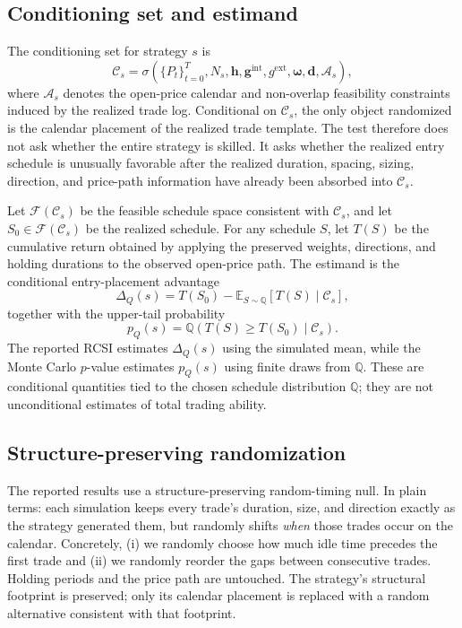 \documentclass[preprint,12pt]{elsarticle}
\theoremstyle{definition}
\begin{document}
\subsection{Conditioning set and estimand}
\label{sec:conditioning-estimand}

The conditioning set for strategy $s$ is
\[
\mathcal{C}_s =
\sigma\!\left(
\{P_t\}_{t=0}^{T},
N_s,
\mathbf{h},
\mathbf{g}^{\mathrm{int}},
g^{\mathrm{ext}},
\boldsymbol{\omega},
\mathbf{d},
\mathcal{A}_s
\right),
\]
where $\mathcal{A}_s$ denotes the open-price calendar and non-overlap feasibility constraints induced by the realized trade log. Conditional on $\mathcal{C}_s$, the only object randomized is the calendar placement of the realized trade template. The test therefore does not ask whether the entire strategy is skilled. It asks whether the realized entry schedule is unusually favorable after the realized duration, spacing, sizing, direction, and price-path information have already been absorbed into $\mathcal{C}_s$.

Let $\mathcal{F}(\mathcal{C}_s)$ be the feasible schedule space consistent with $\mathcal{C}_s$, and let $S_0\in \mathcal{F}(\mathcal{C}_s)$ be the realized schedule. For any schedule $S$, let $T(S)$ be the cumulative return obtained by applying the preserved weights, directions, and holding durations to the observed open-price path. The estimand is the conditional entry-placement advantage
\[
\Delta_Q(s)=T(S_0)-\mathbb{E}_{S\sim \mathbb{Q}}\!\left[T(S)\mid \mathcal{C}_s\right],
\]
together with the upper-tail probability
\[
p_Q(s)=\mathbb{Q}\!\left(T(S)\ge T(S_0)\mid \mathcal{C}_s\right).
\]
The reported RCSI estimates $\Delta_Q(s)$ using the simulated mean, while the Monte Carlo $p$-value estimates $p_Q(s)$ using finite draws from $\mathbb{Q}$. These are conditional quantities tied to the chosen schedule distribution $\mathbb{Q}$; they are not unconditional estimates of total trading ability.

\subsection{Structure-preserving randomization}
\label{sec:spr}

The reported results use a structure-preserving random-timing null. In plain terms: each simulation keeps every trade's duration, size, and direction exactly as the strategy generated them, but randomly shifts \emph{when} those trades occur on the calendar. Concretely, (i) we randomly choose how much idle time precedes the first trade and (ii) we randomly reorder the gaps between consecutive trades. Holding periods and the price path are untouched. The strategy's structural footprint is preserved; only its calendar placement is replaced with a random alternative consistent with that footprint.
\end{document}
